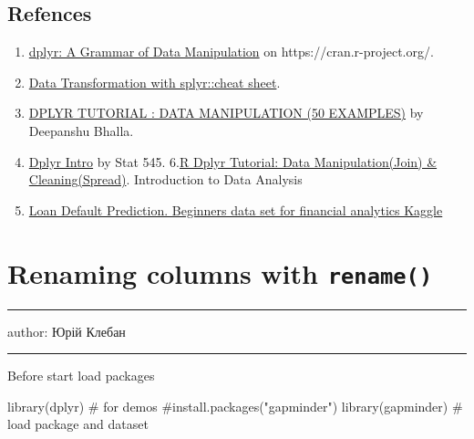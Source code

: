 \documentclass[
  letterpaper,
  DIV=11,
  numbers=noendperiod]{scrreprt}
\newenvironment{Shaded}{\begin{snugshade}}{\end{snugshade}}
\newcommand{\CommentTok}[1]{\textcolor[rgb]{0.37,0.37,0.37}{#1}}
\newcommand{\FunctionTok}[1]{\textcolor[rgb]{0.28,0.35,0.67}{#1}}
\newcommand{\NormalTok}[1]{\textcolor[rgb]{0.00,0.23,0.31}{#1}}
\providecommand{\tightlist}{%
  \setlength{\itemsep}{0pt}\setlength{\parskip}{0pt}}\usepackage{longtable,booktabs,array}
\begin{document}
\section{Refences}\label{refences-4}

\begin{enumerate}
\def\labelenumi{\arabic{enumi}.}
\tightlist
\item
  \href{https://cran.r-project.org/web/packages/dplyr/index.html}{dplyr:
  A Grammar of Data Manipulation} on https://cran.r-project.org/.
\item
  \href{https://github.com/rstudio/cheatsheets/blob/master/data-transformation.pdf}{Data
  Transformation with splyr::cheat sheet}.
\item
  \href{https://www.listendata.com/2016/08/dplyr-tutorial.html}{DPLYR
  TUTORIAL : DATA MANIPULATION (50 EXAMPLES)} by Deepanshu Bhalla.
\item
  \href{https://stat545.com/dplyr-intro.html}{Dplyr Intro} by Stat 545.
  6.\href{https://www.guru99.com/r-dplyr-tutorial.html}{R Dplyr
  Tutorial: Data Manipulation(Join) \& Cleaning(Spread)}. Introduction
  to Data Analysis
\item
  \href{https://www.kaggle.com/kmldas/loan-default-prediction}{Loan
  Default Prediction. Beginners data set for financial analytics Kaggle}
\end{enumerate}

\chapter{\texorpdfstring{Renaming columns with
\textbf{\texttt{rename()}}}{Renaming columns with rename()}}\label{renaming-columns-with-rename}

\begin{center}\rule{0.5\linewidth}{0.5pt}\end{center}

author: Юрій Клебан

\begin{center}\rule{0.5\linewidth}{0.5pt}\end{center}

Before start load packages

\begin{Shaded}
\begin{Highlighting}[]
\FunctionTok{library}\NormalTok{(dplyr) }\CommentTok{\# for demos}
\CommentTok{\#install.packages("gapminder")}
\FunctionTok{library}\NormalTok{(gapminder)  }\CommentTok{\# load package and dataset}
\end{Highlighting}
\end{Shaded}
\end{document}
